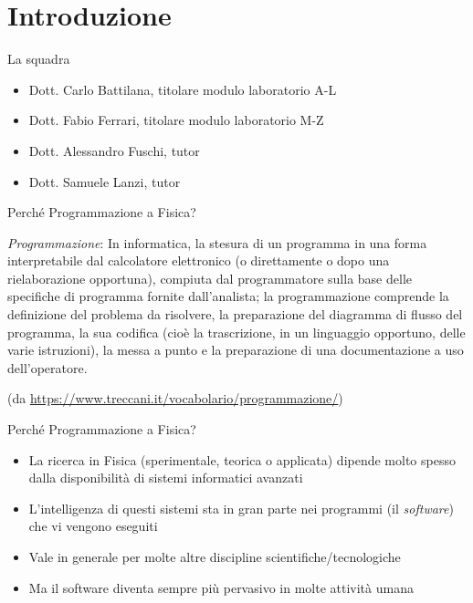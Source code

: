 
\section*{Introduzione}

\begin{frame}{La squadra}

  \begin{itemize}
  \item Dott. Carlo Battilana, titolare modulo laboratorio A-L
  \item Dott. Fabio Ferrari, titolare modulo laboratorio M-Z
  \item Dott. Alessandro Fuschi, tutor
  \item Dott. Samuele Lanzi, tutor
  \end{itemize}

\end{frame}

\begin{frame}{Perché Programmazione a Fisica?}

  \textit{Programmazione}: In informatica, la stesura di un programma in una
  forma interpretabile dal calcolatore elettronico (o direttamente o dopo una
  rielaborazione opportuna), compiuta dal programmatore sulla base delle
  specifiche di programma fornite dall'analista; la programmazione comprende la
  definizione del problema da risolvere, la preparazione del diagramma di flusso
  del programma, la sua codifica (cioè la trascrizione, in un linguaggio
  opportuno, delle varie istruzioni), la messa a punto e la preparazione di una
  documentazione a uso dell'operatore.

  {\tiny (da \url{https://www.treccani.it/vocabolario/programmazione/})}

\end{frame}

\begin{frame}{Perché Programmazione a Fisica? \insertcontinuationtext}

  \begin{itemize}[<+->]
  \item La ricerca in Fisica (sperimentale, teorica o applicata) dipende
    molto spesso dalla disponibilità di sistemi informatici avanzati
  \item L'intelligenza di questi sistemi sta in gran parte nei programmi (il
    \textit{software}) che vi vengono eseguiti
  \item Vale in generale per molte altre discipline scientifiche/tecnologiche
  \item Ma il software diventa sempre più pervasivo in molte attività umana
  \end{itemize}

\end{frame}


